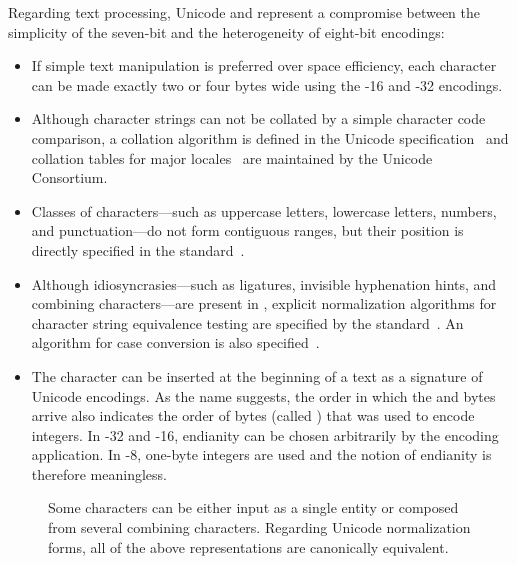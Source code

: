 Regarding text processing, Unicode and  represent a compromise
between the simplicity of the seven-bit  and the heterogeneity of
eight-bit encodings:
\begin{itemize}
  \item If simple text manipulation is preferred over space efficiency, each
    character can be made exactly two or four bytes wide using the
    -16 and -32 encodings.
  \item Although character strings can not be collated by a simple character
    code comparison, a collation algorithm is defined in the Unicode
    specification~\cite{unicode16:collation} and collation tables for major
    locales~\cite{unicode16:cldr} are maintained by the Unicode Consortium.
  \item Classes of characters---such as uppercase letters, lowercase letters,
    numbers, and punctuation---do not form contiguous ranges, but their position
    is directly specified in the standard~\cite[sec.\,4.5]{unicode16}.
  \item Although idiosyncrasies---such as ligatures, invisible hyphenation
    hints, and combining characters---are present in , explicit
    normalization algorithms for character string equivalence testing are
    specified by the standard~\cite[sec.\,2.12]{unicode16}. An algorithm
    for case conversion is also specified~\cite[sec.\,3.13]{unicode16}.
  \item The  character can be inserted at the
    beginning of a text as a signature of Unicode encodings. As the name
    suggests, the order in which the  and  bytes arrive also
    indicates the order of bytes (called ) that was used to
    encode integers. In -32 and -16, endianity
    can be chosen arbitrarily by the encoding application. In -8,
    one-byte integers are used and the notion of endianity is therefore
    meaningless.
\end{itemize}

\begin{figure}
  
  \caption{Some  characters can be either input as a single
    entity or composed from several combining characters. Regarding Unicode
    normalization forms, all of the above representations are canonically
    equivalent.}
\end{figure}

